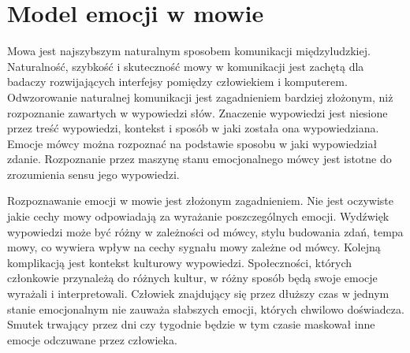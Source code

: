 \documentclass[a4paper,12pt,twoside,openany]{report}
\begin{document}
\section{Model emocji w mowie}
Mowa jest najszybszym naturalnym sposobem komunikacji międzyludzkiej.
Naturalność, szybkość i skuteczność mowy w komunikacji jest zachętą dla badaczy rozwijających interfejsy pomiędzy człowiekiem i komputerem. 
Odwzorowanie naturalnej komunikacji jest zagadnieniem bardziej złożonym, niż rozpoznanie zawartych w wypowiedzi słów.
Znaczenie wypowiedzi jest niesione przez treść wypowiedzi, kontekst i sposób w jaki została ona wypowiedziana.
Emocje mówcy można rozpoznać na podstawie sposobu w jaki wypowiedział zdanie.
Rozpoznanie przez maszynę stanu emocjonalnego mówcy jest istotne do zrozumienia sensu jego wypowiedzi.

Rozpoznawanie emocji w mowie jest złożonym zagadnieniem.
Nie jest oczywiste jakie cechy mowy odpowiadają za wyrażanie poszczególnych emocji.
Wydźwięk wypowiedzi może być różny w zależności od mówcy, stylu budowania zdań, tempa mowy, co wywiera wpływ na cechy sygnału mowy zależne od mówcy.
Kolejną komplikacją jest kontekst kulturowy wypowiedzi. 
Społeczności, których członkowie przynależą do różnych kultur, w różny sposób będą swoje emocje wyrażali i interpretowali.
Człowiek znajdujący się przez dłuższy czas w jednym stanie emocjonalnym nie zauważa słabszych emocji, których chwilowo doświadcza.
Smutek trwający przez dni czy tygodnie będzie w tym czasie maskował inne emocje odczuwane przez człowieka.
\end{document}
